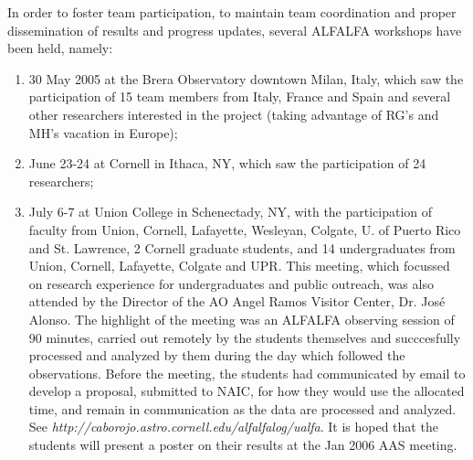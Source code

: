 In order to foster team participation, to maintain team coordination and 
proper dissemination of results and progress updates, several ALFALFA
workshops have been held, namely: 
\begin {enumerate}
\item 30 May 2005 at the Brera Observatory
downtown Milan, Italy, which saw the participation of 15 team members from
Italy, France and Spain and several other researchers interested in the 
project (taking advantage of RG's and MH's vacation in Europe); 
\item June 23-24
at Cornell in Ithaca, NY, which saw the participation of 24 researchers; 
\item 
July 6-7 at Union College in Schenectady, NY, with the participation of 
faculty from Union, Cornell,
Lafayette, Wesleyan, Colgate, U. of Puerto Rico and St. Lawrence, 2
Cornell graduate students, and 14 undergraduates from Union, Cornell,
Lafayette, Colgate and UPR. This
meeting, which focussed on research experience for undergraduates and
public outreach, was also attended by the Director of the AO Angel Ramos
Visitor Center, Dr. Jos\'e Alonso. The highlight of the meeting was
an ALFALFA observing session of 90 minutes, carried out remotely by the
students themselves and succcesfully processed and analyzed by them during
the day which followed the observations. Before the meeting, the students
had communicated by email to develop a proposal, submitted to NAIC,
for how they would use the allocated time, and remain in communication
as the data are processed and analyzed. See
{\it http://caborojo.astro.cornell.edu/alfalfalog/ualfa}. It is hoped
that the students will present a poster on their results at the Jan 2006
AAS meeting.
\end{enumerate}


